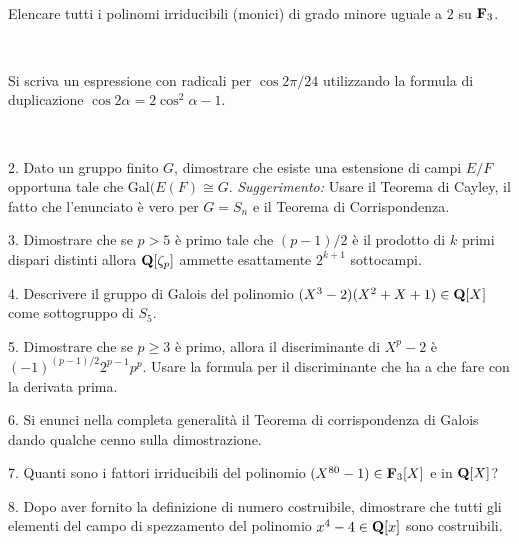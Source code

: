 \ \dotfill\ \bigskip\bigskip\bigskip\vfil

 Elencare tutti i polinomi irriducibili (monici) di grado minore uguale a $2$ su ${\bf F}_{3}$.\medskip\bigskip\bigskip

\ \dotfill\ \bigskip\bigskip\bigskip

 Si scriva un espressione con radicali per $\cos 2\pi/24$ utilizzando la formula di duplicazione $\cos2\alpha=2\cos^2\alpha-1$.\medskip\bigskip\bigskip

\ \dotfill\ \bigskip\bigskip\bigskip

\vfil\eject


\item{2.} Dato un gruppo finito $G$, dimostrare che esiste una estensione di campi $E/F$ opportuna tale che
Gal$(E(F)\cong G$.\hfill\break 
{\it Suggerimento:} Usare il Teorema di Cayley, il fatto che l'enunciato \`e vero
per $G=S_n$ e il Teorema di Corrispondenza.

\vv


\item{3.} Dimostrare che se $p>5$ \`e primo tale che $(p-1)/2$ \`e il prodotto di $k$ primi dispari distinti allora 
${\bf Q}[\zeta_{p}]$ ammette esattamente $2^{k+1}$ sottocampi.
\ve\ \vs


\item{4.} Descrivere il gruppo di Galois del polinomio $(X^3-2)(X^2+X+1)\in{\bf Q}[X]$ come sottogruppo di $S_5$. \vv

\item{5.} Dimostrare che se $p\geq3$ \`e primo, allora il discriminante di $X^p-2$ \`e $(-1)^{(p-1)/2}2^{p-1}p^p$.
\hfill{} Usare la formula per il discriminante che ha a che fare con la derivata prima.
\ve\ \vs


\item{6.} Si enunci nella completa generalit\`a il Teorema di
corrispondenza di Galois dando qualche cenno sulla dimostrazione.\vskip 6cm\bigskip\bigskip\bigskip\vv\vv


\item{7.} Quanti sono i fattori irriducibili del polinomio $(X^{80}-1)\in{\bf F}_3[X]$ e in ${\bf Q}[X]$?
\vskip 6cm\bigskip\bigskip\bigskip\vv\vv

\item{8.}  Dopo aver fornito la definizione di numero costruibile, dimostrare che tutti gli elementi del campo di spezzamento del polinomio $x^4-4\in{\bf Q}[x]$
sono costruibili.

\vv

\ \vst
\bye

